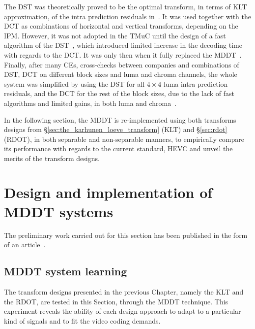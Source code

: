 \documentclass[11pt,a4paper,openright,twoside]{book}
\numberwithin{equation}{section} %
\numberwithin{figure}{section} %
\numberwithin{table}{section} %
\begin{document}
The \ac{DST} was theoretically proved to be the optimal transform, in
terms of \ac{KLT} approximation, of the intra prediction residuals
in~\cite{JCTVC-C108, JCTVC-D033}.
It was used together with the \ac{DCT} as combinations of horizontal and
vertical transforms, depending on the \ac{IPM}.
However, it was not adopted in the \ac{TMuC} until the design of a fast
algorithm of the \ac{DST}~\cite{saxena-13-fast-transforms-intra-coding}, which
introduced limited increase in the decoding time with regards to the \ac{DCT}.
It was only then when it fully replaced the \ac{MDDT}~\cite{JCTVC-D048,
JCTVC-E125, JCTVC-F283, JCTVC-G108}.
Finally, after many \acp{CE}, cross-checks between companies and combinations
of \ac{DST}, \ac{DCT} on different block sizes and luma and chroma channels,
the whole system was simplified by using the \ac{DST} for all $4\times4$ luma
intra prediction residuals, and the \ac{DCT} for the rest of the block sizes,
due to the lack of fast algorithms and limited gains, in both luma and
chroma~\cite{JCTVC-J0021}.

In the following section, the \ac{MDDT} is re-implemented using both
transforms designs from \S\ref{sec:the_karhunen_loeve_transform} (\ac{KLT})
and \S\ref{sec:rdot} (\ac{RDOT}), in both separable and non-separable manners,
to empirically compare its performance with regards to the current standard,
\ac{HEVC} and unveil the merits of the transform designs.

\section{Design and implementation of \acs{MDDT} systems}
\label{sec:mddt_design_and_implementation}

The preliminary work carried out for this section has been published in the
form of an article~\cite{arrufat-14-mddt-rdot}.

\subsection{\acs{MDDT} system learning}
\label{sub:mddt_system_learning}

The transform designs presented in the previous Chapter, namely the \ac{KLT}
and the \ac{RDOT}, are tested in this Section, through the \ac{MDDT}
technique.
This experiment reveals the ability of each design approach to adapt to a
particular kind of signals and to fit the video coding demands.
\end{document}
